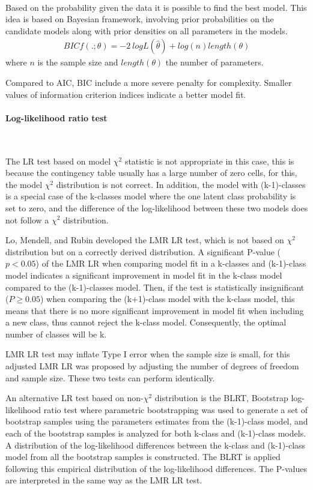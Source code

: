 \documentclass[12pt,a4paper,oneside]{reedthesis}
\begin{document}
~

Based on the probability given the data it is possible to find the best model. This idea is based on Bayesian framework, involving prior probabilities on the candidate models along with prior densities on all parameters in the models.
\begin{align}
BIC{f(.;\theta)} = -2 \: logL(\hat\theta)+log(n)length(\theta)
\end{align}
where \(n\) is the sample size and \(length(\theta)\) the number of parameters.

Compared to AIC, BIC include a more severe penalty for complexity. Smaller values of information criterion indices indicate a better model fit.

\hypertarget{log-likelihood-ratio-test}{%
\paragraph{Log-likelihood ratio test}\label{log-likelihood-ratio-test}}

~

The LR test based on model \(\chi^2\) statistic is not appropriate in this case, this is because the contingency table usually has a large number of zero cells, for this, the model \(\chi^2\) distribution is not correct. In addition, the model with (k-1)-classes is a special case of the k-classes model where the one latent class probability is set to zero, and the difference of the log-likelihood between these two models does not follow a \(\chi^2\) distribution.

Lo, Mendell, and Rubin developed the LMR LR test, which is not based on \(\chi^2\) distribution but on a correctly derived distribution. A significant P-value (\(p<0.05\)) of the LMR LR when comparing model fit in a k-classes and (k-1)-class model indicates a significant improvement in model fit in the k-class model compared to the (k-1)-classes model. Then, if the test is statistically insignificant (\(P\ge 0.05\)) when comparing the (k+1)-class model with the k-class model, this means that there is no more significant improvement in model fit when including a new class, thus cannot reject the k-class model. Consequently, the optimal number of classes will be k.

LMR LR test may inflate Type I error when the sample size is small, for this adjusted LMR LR was proposed by adjusting the number of degrees of freedom and sample size. These two tests can perform identically.

An alternative LR test based on non-\(\chi^2\) distribution is the BLRT, Bootstrap log-likelihood ratio test where parametric bootstrapping was used to generate a set of bootstrap samples using the parameters estimates from the (k-1)-class model, and each of the bootstrap samples is analyzed for both k-class and (k-1)-class models. A distribution of the log-likelihood differences between the k-class and (k-1)-class model from all the bootstrap samples is constructed. The BLRT is applied following this empirical distribution of the log-likelihood differences. The P-values are interpreted in the same way as the LMR LR test.
\end{document}
